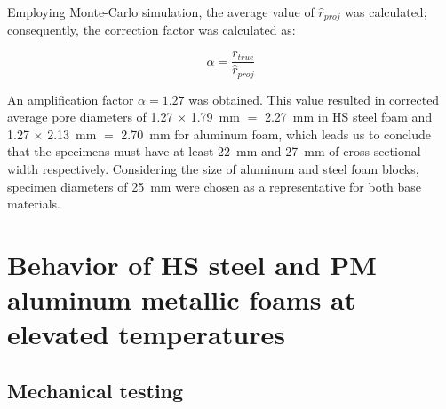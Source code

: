 \documentclass[review]{elsarticle}
\begin{document}
Employing Monte-Carlo simulation, the average value of $\hat{r}_{proj}$ was calculated; consequently, the correction factor was calculated as:

\begin{equation}\label{Eq12}
\alpha=\frac{r_{true}}{\hat{r}_{proj}}
\end{equation}

An amplification factor $\alpha=1.27$ was obtained. This value resulted in corrected average pore diameters of 1.27 $\times$ 1.79~mm $=$ 2.27~mm in HS steel foam and 1.27 $\times$ 2.13~mm $=$ 2.70~mm for aluminum foam, which leads us to conclude that the specimens must have at least 22~mm and 27~mm of cross-sectional width respectively. Considering the size of aluminum and steel foam blocks, specimen diameters of 25~mm were chosen as a representative for both base materials.


\section{Behavior of HS steel and PM aluminum metallic foams at elevated temperatures}

\subsection*{Mechanical testing}
\end{document}

